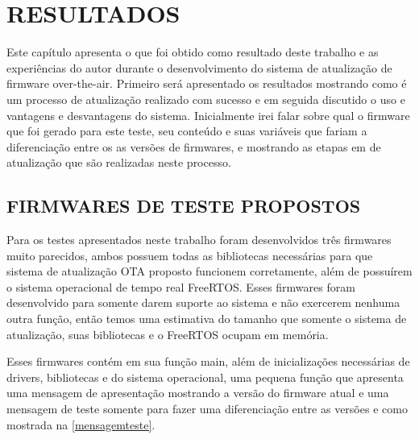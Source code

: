 \chapter{RESULTADOS}
\label{Chap:Resultados}

Este capítulo apresenta o que foi obtido como resultado deste trabalho e as experiências do autor durante o desenvolvimento do sistema de atualização de firmware over-the-air. Primeiro será apresentado os resultados mostrando como é um processo de atualização realizado com sucesso e em seguida discutido o uso e vantagens e desvantagens do sistema. 
Inicialmente irei falar sobre qual o firmware que foi gerado para este teste, seu conteúdo e suas variáveis que fariam a diferenciação entre os as versões de firmwares, e mostrando as etapas em de atualização que são realizadas neste processo.

\section {FIRMWARES DE TESTE PROPOSTOS}
Para os testes apresentados neste trabalho foram desenvolvidos três firmwares muito parecidos, ambos possuem todas as bibliotecas necessárias para que sistema de atualização OTA proposto funcionem corretamente, além de possuírem o sistema operacional de tempo real FreeRTOS. Esses firmwares foram desenvolvido para somente darem suporte ao sistema e não exercerem nenhuma outra função, então temos uma estimativa do tamanho que somente o sistema de atualização, suas bibliotecas e o FreeRTOS ocupam em memória.

Esses firmwares contém em sua função main, além de inicializações necessárias de drivers, bibliotecas e do sistema operacional, uma pequena função que apresenta uma mensagem de apresentação mostrando a versão do firmware atual e uma mensagem de teste somente para fazer uma diferenciação entre as versões e como mostrada na \autoref{mensagemteste}. 

